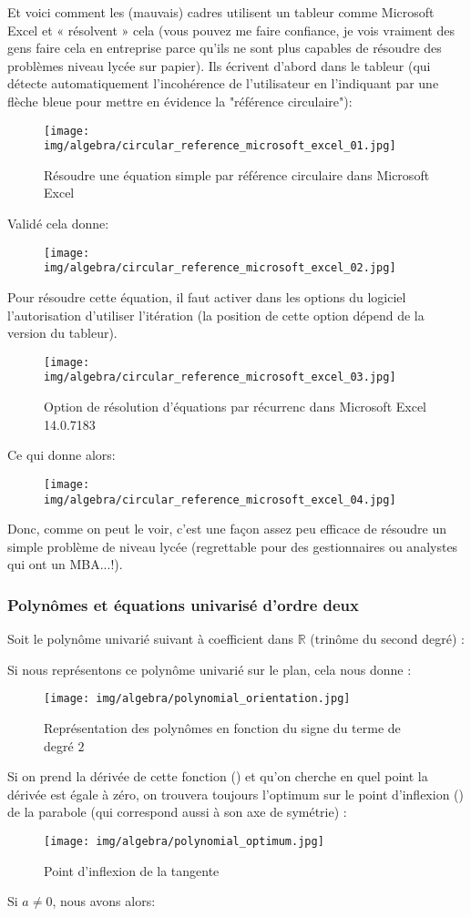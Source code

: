 	Et voici comment les (mauvais) cadres utilisent un tableur comme Microsoft Excel et « résolvent » cela (vous pouvez me faire confiance, je vois vraiment des gens  faire cela en entreprise parce qu'ils ne sont plus capables de résoudre des problèmes niveau lycée sur papier). Ils écrivent d'abord dans le tableur (qui détecte automatiquement l'incohérence de l'utilisateur en l'indiquant par une flèche bleue pour mettre en évidence la "référence circulaire"):
	\begin{figure}[H]
		\centering
		\texttt{[image: img/algebra/circular\_reference\_microsoft\_excel\_01.jpg]}
		\caption{Résoudre une équation simple par référence circulaire dans Microsoft Excel}
	\end{figure}
	Validé cela donne:
	\begin{figure}[H]
		\centering
		\texttt{[image: img/algebra/circular\_reference\_microsoft\_excel\_02.jpg]}
	\end{figure}
	Pour résoudre cette équation, il faut activer dans les options du logiciel l'autorisation d'utiliser l'itération (la position de cette option dépend de la version du tableur).
	\begin{figure}[H]
		\centering
		\texttt{[image: img/algebra/circular\_reference\_microsoft\_excel\_03.jpg]}
		\caption[]{Option de résolution d'équations par récurrenc dans Microsoft Excel 14.0.7183}
	\end{figure}
	Ce qui donne alors:
	\begin{figure}[H]
		\centering
		\texttt{[image: img/algebra/circular\_reference\_microsoft\_excel\_04.jpg]}
	\end{figure}
	Donc, comme on peut le voir, c'est une façon assez peu efficace de résoudre un simple problème de niveau lycée (regrettable pour des gestionnaires ou analystes  qui ont un MBA...!).

	\subsubsection{Polynômes et équations univarisé d'ordre deux}\label{second order polynomials}
	Soit le polynôme univarié suivant à coefficient dans $\mathbb{R}$ (trinôme du second degré) :
	
	Si nous représentons ce polynôme univarié sur le plan, cela nous donne :
	\begin{figure}[H]
		\centering
		\texttt{[image: img/algebra/polynomial\_orientation.jpg]}
		\caption{Représentation des polynômes en fonction du signe du terme de degré $2$}
	\end{figure}
	Si on prend la dérivée de cette fonction () et qu'on cherche en quel point la dérivée est égale à zéro, on trouvera toujours l'optimum sur le point d'inflexion () de la parabole (qui correspond aussi à son axe de symétrie) :
	\begin{figure}[H]
		\centering
		\texttt{[image: img/algebra/polynomial\_optimum.jpg]}
		\caption{Point d'inflexion de la tangente}
	\end{figure}
	Si $a\neq 0$, nous avons alors:
	
